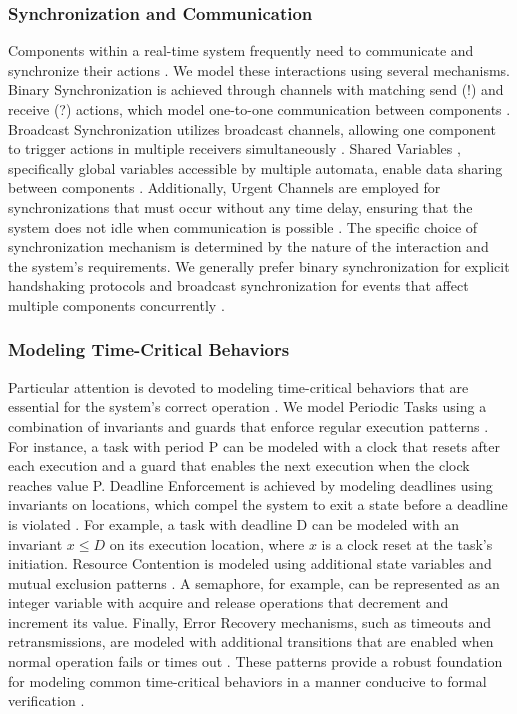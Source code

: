 \subsubsection{Synchronization and Communication}
Components within a real-time system frequently need to communicate and synchronize their actions \cite{hoare1978communicating,roscoe1998theory}. We model these interactions using several mechanisms.  Binary Synchronization  is achieved through channels with matching send (!) and receive (?) actions, which model one-to-one communication between components \cite{larsen1997uppaal,hoare1978communicating}.  Broadcast Synchronization  utilizes broadcast channels, allowing one component to trigger actions in multiple receivers simultaneously \cite{bengtsson1996uppaal,david2015uppaal}.  Shared Variables , specifically global variables accessible by multiple automata, enable data sharing between components \cite{roscoe1998theory,larsen1997uppaal}. Additionally,  Urgent Channels  are employed for synchronizations that must occur without any time delay, ensuring that the system does not idle when communication is possible \cite{larsen1997uppaal,bengtsson2003timed}. The specific choice of synchronization mechanism is determined by the nature of the interaction and the system's requirements. We generally prefer binary synchronization for explicit handshaking protocols and broadcast synchronization for events that affect multiple components concurrently \cite{hoare1978communicating,david2015uppaal}.

\subsubsection{Modeling Time-Critical Behaviors}
Particular attention is devoted to modeling time-critical behaviors that are essential for the system's correct operation \cite{kopetz2022real,buttazzo1997hard}. We model  Periodic Tasks  using a combination of invariants and guards that enforce regular execution patterns \cite{sha2004real,liu1973scheduling}. For instance, a task with period P can be modeled with a clock that resets after each execution and a guard that enables the next execution when the clock reaches value P.  Deadline Enforcement  is achieved by modeling deadlines using invariants on locations, which compel the system to exit a state before a deadline is violated \cite{alur1994theory,buttazzo1997hard}. For example, a task with deadline D can be modeled with an invariant $x \leq D$ on its execution location, where $x$ is a clock reset at the task's initiation.  Resource Contention  is modeled using additional state variables and mutual exclusion patterns \cite{scherer2006synchronization,sha2004real}. A semaphore, for example, can be represented as an integer variable with acquire and release operations that decrement and increment its value. Finally,  Error Recovery  mechanisms, such as timeouts and retransmissions, are modeled with additional transitions that are enabled when normal operation fails or times out \cite{kopetz2022real,safari2022survey}. These patterns provide a robust foundation for modeling common time-critical behaviors in a manner conducive to formal verification \cite{clarke2018handbook,sha2004real}.

